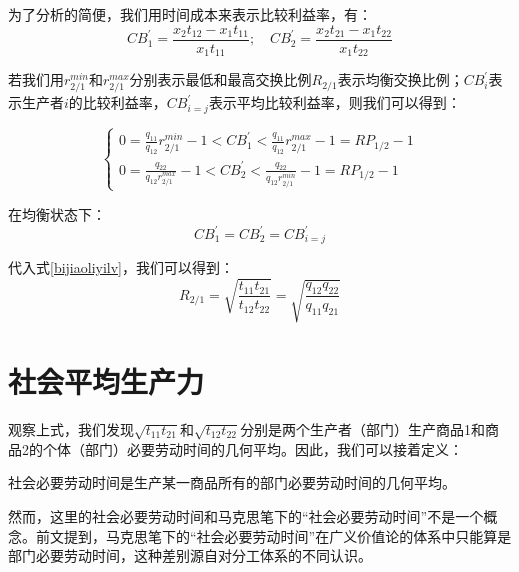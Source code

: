 为了分析的简便，我们用时间成本来表示比较利益率，有：
\begin{equation}
    \label{bijiaoliyilv}
    \mathit{CB}^{\prime}_1 = \frac{x_2 t_{12} - x_1 t_{11}}{x_1 t_{11}}; \quad \mathit{CB}^{\prime}_2 = \frac{x_2 t_{21} - x_1 t_{22}}{x_1 t_{22}}
\end{equation}

若我们用$r^{\mathit{min}}_{2/1}$和$r^{\mathit{max}}_{2/1}$分别表示最低和最高交换比例$\mathit{R}_{2/1}$表示均衡交换比例；$\mathit{CB}^{\prime}_i$表示生产者$i$的比较利益率，$\mathit{CB}^{\prime}_{i=j}$表示平均比较利益率，则我们可以得到\cite[66]{CaiJiMingCongXiaYiJieZhiLunDaoGuangYiJieZhiLunXiuDingBan2022}：

\begin{equation}
    \begin{cases}
        0 = \frac{q_{11}}{q_{12}}r^{\mathit{min}}_{2/1} - 1 < \mathit{CB}^{\prime}_1 < \frac{q_{11}}{q_{12}}r^{\mathit{max}}_{2/1} - 1 = \mathit{RP}_{1/2} - 1 \\
        0 = \frac{q_{22}}{q_{12}r^{\mathit{max}}_{2/1}} - 1 < \mathit{CB}^{\prime}_2 < \frac{q_{22}}{q_{12}r^{\mathit{min}}_{2/1}} - 1 = \mathit{RP}_{1/2} - 1
    \end{cases}
\end{equation}

在均衡状态下：
\begin{equation}
    \mathit{CB}^{\prime}_1 = \mathit{CB}^{\prime}_2 = \mathit{CB}^{\prime}_{i=j}
\end{equation}

代入式\ref{bijiaoliyilv}，我们可以得到：
\begin{equation}
    \label{junhengjiaohuanbili}
    \mathit{R}_{2/1} = \sqrt{\frac{t_{11}t_{21}}{t_{12}t_{22}}} = \sqrt{\frac{q_{12}q_{22}}{q_{11}q_{21}}}
\end{equation}

\section{社会平均生产力}

观察上式，我们发现$\sqrt{t_{11}t_{21}}$和$\sqrt{t_{12}t_{22}}$分别是两个生产者（部门）生产商品1和商品2的个体（部门）必要劳动时间的几何平均。因此，我们可以接着定义：
\begin{definition}
    社会必要劳动时间是生产某一商品所有的部门必要劳动时间的几何平均。
\end{definition}

然而，这里的社会必要劳动时间和马克思笔下的“社会必要劳动时间”不是一个概念。前文提到，马克思笔下的“社会必要劳动时间”在广义价值论的体系中只能算是部门必要劳动时间，这种差别源自对分工体系的不同认识。

